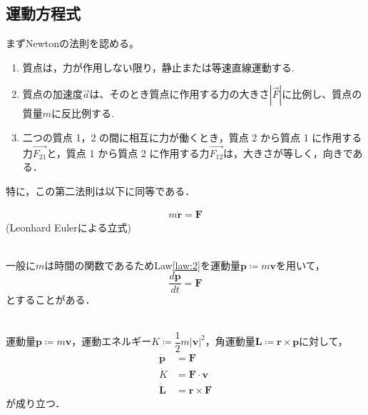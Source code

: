 \documentclass[dvipdfmx,uplatex]{jsarticle}
\begin{document}
\subsection{運動方程式}
まずNewtonの法則を認める。
\begin{law}\mbox{}
\begin{enumerate}
\item 質点は，力が作用しない限り，静止または等速直線運動する.
\item 質点の加速度$\overrightarrow{a}$は、そのとき質点に作用する力の大きさ$\left|{\overrightarrow{F}}\right|$に比例し、質点の質量$m$に反比例する.
\item 二つの質点 1，2 の間に相互に力が働くとき，質点 2 から質点 1 に作用する力$\overrightarrow{F_{21}}$と，質点 1 から質点 2 に作用する力$\overrightarrow{F_{12}}$は，大きさが等しく，向きである．
\end{enumerate}
\end{law}
特に，この第二法則は以下に同等である．
\begin{law}[第2法則の言い換え]\label{law:2}

\begin{align}
m \ddot{\bm{r}} = \bm{F} \label{equation-of-motion}
\end{align}
(Leonhard Eulerによる立式)
\end{law}

\begin{cf}\label{cf:1.3}\mbox{}\\
  一般に$m$は時間の関数であるため\rm{Law}\ref{law:2}を運動量$\bm{p} \coloneqq m \bm{v}$を用いて，
  \begin{equation*}
    \frac{d\bm{p}}{dt} = \bm{F}
  \end{equation*}
  とすることがある．
\end{cf}

\begin{theo}\mbox{}\\
  運動量$\bm{p} \coloneqq m \bm{v}$，運動エネルギー$K \coloneqq \dfrac{1}{2} m |\bm{v}|^2$，角運動量$\bm{L} \coloneqq \bm{r} \times \bm{p}$に対して，
  \begin{align}
    \bm{\dot{p}} &= \bm{F} \label{eq:1.2}\\
    \dot{K} &= \bm{F} \cdot \bm{v} \label{eq:1.3} \\
    \bm{\dot{L}} &= \bm{r} \times \bm{F} \label{eq:1.4}
  \end{align}
  が成り立つ．
\end{theo}
\end{document}
